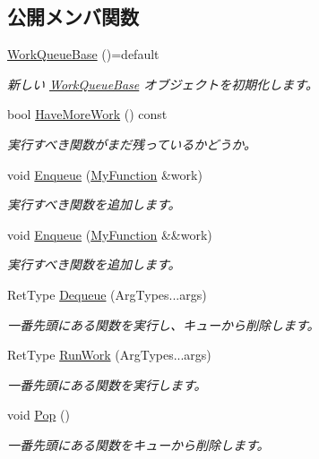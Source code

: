 \subsection*{公開メンバ関数}
\begin{DoxyCompactItemize}
\item 
\hyperlink{class_utility_1_1_work_queue_base_ab881136d649a36e6f04cdc1f67beae08}{Work\+Queue\+Base} ()=default
\begin{DoxyCompactList}\small\item\em 新しい \hyperlink{class_utility_1_1_work_queue_base}{Work\+Queue\+Base} オブジェクトを初期化します。\end{DoxyCompactList}\item 
bool \hyperlink{class_utility_1_1_work_queue_base_a682eab32915823ad6782116dd173b7bc}{Have\+More\+Work} () const 
\begin{DoxyCompactList}\small\item\em 実行すべき関数がまだ残っているかどうか。\end{DoxyCompactList}\item 
void \hyperlink{class_utility_1_1_work_queue_base_a4ecb958dcd62ae825d554989ae42de41}{Enqueue} (\hyperlink{classstd_1_1function}{My\+Function} \&work)
\begin{DoxyCompactList}\small\item\em 実行すべき関数を追加します。\end{DoxyCompactList}\item 
void \hyperlink{class_utility_1_1_work_queue_base_a70fd2fe67a06ec46f9719554bbb2efbd}{Enqueue} (\hyperlink{classstd_1_1function}{My\+Function} \&\&work)
\begin{DoxyCompactList}\small\item\em 実行すべき関数を追加します。\end{DoxyCompactList}\item 
Ret\+Type \hyperlink{class_utility_1_1_work_queue_base_a5c129e5b8605d28bed51f33767cd8af6}{Dequeue} (Arg\+Types...\+args)
\begin{DoxyCompactList}\small\item\em 一番先頭にある関数を実行し、キューから削除します。\end{DoxyCompactList}\item 
Ret\+Type \hyperlink{class_utility_1_1_work_queue_base_ab8384746b144ee2225ded569371a2437}{Run\+Work} (Arg\+Types...\+args)
\begin{DoxyCompactList}\small\item\em 一番先頭にある関数を実行します。\end{DoxyCompactList}\item 
void \hyperlink{class_utility_1_1_work_queue_base_a9be74bbf9df0c7bd46de3810567d7b8e}{Pop} ()
\begin{DoxyCompactList}\small\item\em 一番先頭にある関数をキューから削除します。\end{DoxyCompactList}\end{DoxyCompactItemize}


